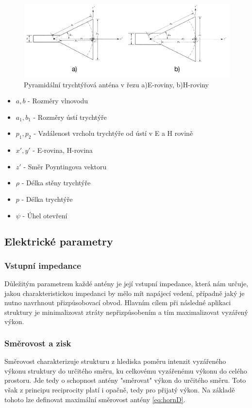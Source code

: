 \begin{figure}[!htbp]
\begin{center}
\includegraphics[width=15cm]{pics/hornEH}
\caption{Pyramidální trychtýřová anténa v řezu a)E-roviny, b)H-roviny \cite{ConstantineTheory}}
\label{fig:hornEH}
\end{center}
\end{figure}
\begin{itemize}
\item $a, b$ - Rozměry vlnovodu
\item $a_1, b_1$ - Rozměry ústí trychtýře
\item $p_1, p_2$ - Vzdálenost vrcholu trychtýře od ústí v E a H rovině
\item $x', y'$ - E-rovina, H-rovina
\item $z'$ - Směr Poyntingova vektoru
\item $\rho$ - Délka stěny trychtýře
\item $p$ - Délka trychtýře
\item $\psi$ - Úhel otevření
\end{itemize}

\subsection{Elektrické parametry}

\subsubsection{Vstupní impedance}
Důležitým parametrem každé antény je její vstupní impedance, která nám určuje, jakou charakteristickou impedanci by mělo mít napájecí vedení, případně jaký je nutno navrhnout přizpůsobovací obvod. Hlavním cílem při následné aplikaci struktury je minimalizovat ztráty nepřizpůsobením a tím maximalizovat vyzářený výkon.

\subsubsection{Směrovost a zisk}
Směrovost charakterizuje strukturu z hlediska poměru intenzit vyzářeného výkonu struktury do určitého směru, ku celkovému vyzářenému výkonu do celého prostoru. Jde tedy o schopnost antény "směrovat" výkon do určitého směru. Toto však z principu reciprocity platí i opačně, tedy pro přijatý výkon. Na základě tohoto lze definovat maximální směrovost antény \ref{eq:hornD}.

